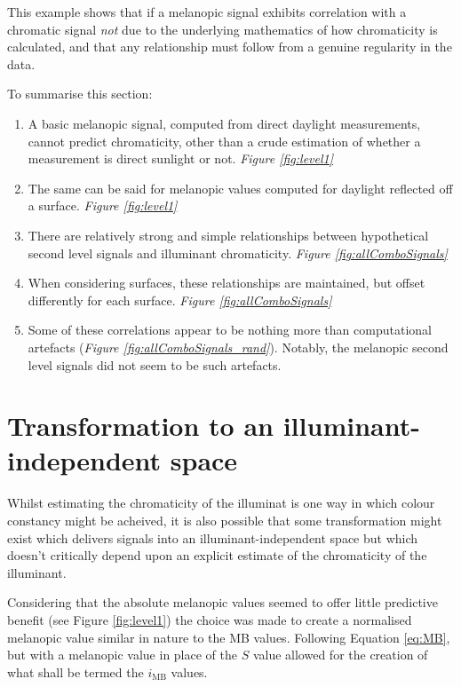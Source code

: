 This example shows that if a melanopic signal exhibits correlation with a chromatic signal \emph{not} due to the underlying mathematics of how chromaticity is calculated, and that any relationship must follow from a genuine regularity in the data.

\bigskip
\noindent
To summarise this section:

\begin{enumerate}
   \item A basic melanopic signal, computed from direct daylight measurements, cannot predict chromaticity, other than a crude estimation of whether a measurement is direct sunlight or not. \emph{Figure \ref{fig:level1}}
    \item The same can be said for melanopic values computed for daylight reflected off a surface. \emph{Figure \ref{fig:level1}}
    \item There are relatively strong and simple relationships between hypothetical second level signals and illuminant chromaticity. \emph{Figure \ref{fig:allComboSignals}}
    \item When considering surfaces, these relationships are maintained, but offset differently for each surface. \emph{Figure \ref{fig:allComboSignals}}
    \item Some of these correlations appear to be nothing more than computational artefacts (\emph{Figure \ref{fig:allComboSignals_rand}}). Notably, the melanopic second level signals did not seem to be such artefacts.
\end{enumerate}

\clearpage


\section{Transformation to an illuminant-independent space}

Whilst estimating the chromaticity of the illuminat is one way in which colour constancy might be acheived, it is also possible that some transformation might exist which delivers signals into an illuminant-independent space but which doesn't critically depend upon an explicit estimate of the chromaticity of the illuminant.

Considering that the absolute melanopic values seemed to offer little predictive benefit (see Figure \ref{fig:level1}) the choice was made to create a normalised melanopic value similar in nature to the MB values. Following Equation \ref{eq:MB}, but with a melanopic value in place of the $S$ value allowed for the creation of what shall be termed the $i_{\text{MB}}$ values.

